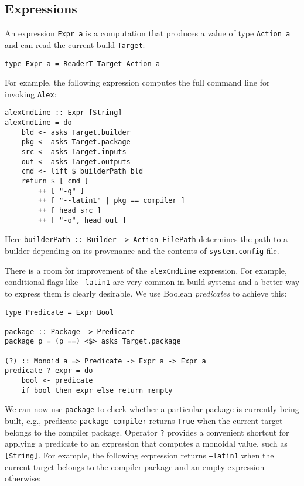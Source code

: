 \subsection{Expressions}

An expression \texttt{Expr a} is a computation that produces a value of type
\texttt{Action a} and can read the current build \texttt{Target}:

\begin{lstlisting}[basicstyle=\ttfamily]
type Expr a = ReaderT Target Action a
\end{lstlisting}

For example, the following expression computes the full command line for
invoking \texttt{Alex}:

\begin{lstlisting}[basicstyle=\ttfamily]
alexCmdLine :: Expr [String]
alexCmdLine = do
    bld <- asks Target.builder
    pkg <- asks Target.package
    src <- asks Target.inputs
    out <- asks Target.outputs
    cmd <- lift $ builderPath bld
    return $ [ cmd ]
        ++ [ "-g" ]
        ++ [ "--latin1" | pkg == compiler ]
        ++ [ head src ]
        ++ [ "-o", head out ]
\end{lstlisting}

\noindent Here \texttt{builderPath :: Builder -> Action FilePath} determines the
path to a builder depending on its provenance and the contents of
\texttt{system.config} file.

There is a room for improvement of the \texttt{alexCmdLine} expression. For
example, conditional flags like \texttt{--latin1} are very common in build
systems and a better way to express them is clearly desirable. We use Boolean
\emph{predicates} to achieve this:

\begin{lstlisting}[basicstyle=\ttfamily]
type Predicate = Expr Bool

package :: Package -> Predicate
package p = (p ==) <$> asks Target.package

(?) :: Monoid a => Predicate -> Expr a -> Expr a
predicate ? expr = do
    bool <- predicate
    if bool then expr else return mempty
\end{lstlisting}

We can now use \texttt{package} to check whether a particular package is
currently being built, e.g., predicate \texttt{package compiler} returns
\texttt{True} when the current target belongs to the compiler package.
Operator \texttt{?} provides a convenient shortcut for applying a predicate
to an expression that computes a monoidal value, such as \texttt{[String]}. For
example, the following expression returns \texttt{--latin1} when the current
target belongs to the compiler package and an empty expression otherwise:

